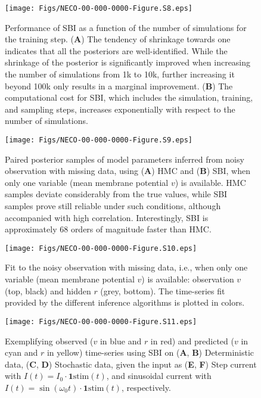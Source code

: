 \documentclass[12pt]{article}
\begin{document}
\begin{figure}[ht]
    \centering
    \texttt{[image: Figs/NECO-00-000-0000-Figure.S8.eps]}
    \renewcommand{\thefigure}{S\arabic{figure}}
    \caption{Performance of SBI as a function of the number of simulations for the training step. (\textbf{A}) The tendency of shrinkage towards one indicates that all the posteriors are well-identified. While the shrinkage of the posterior is significantly improved when increasing the number of simulations from 1k to 10k, further increasing it beyond 100k only results in a marginal improvement. (\textbf{B}) The computational cost for SBI, which includes the simulation, training, and sampling steps, increases exponentially with respect to the number of simulations. }
    \label{fig:SBI_ZandShrink}
\end{figure}


\begin{figure}
    \centering
    \texttt{[image: Figs/NECO-00-000-0000-Figure.S9.eps]}
    \renewcommand{\thefigure}{S\arabic{figure}}
    \caption{Paired posterior samples of model parameters inferred from noisy observation with missing data, using (\textbf{A}) HMC and (\textbf{B}) SBI, when only one variable (mean membrane potential $v$) is available. HMC samples deviate considerably from the true values, while SBI samples prove still reliable under such conditions, although accompanied with high correlation. Interestingly, SBI is approximately 68 orders of magnitude faster than HMC.}
    \label{fig:SDE_missingdata_joint_posterior}
\end{figure}


\begin{figure}[ht]
    \centering
    \texttt{[image: Figs/NECO-00-000-0000-Figure.S10.eps]}
    \renewcommand{\thefigure}{S\arabic{figure}}
    \caption{Fit to the noisy observation with missing data, i.e., when only one variable (mean membrane potential $v$) is available: observation $v$ (top, black) and hidden $r$ (grey, bottom). The time-series fit provided by the different inference algorithms is plotted in colors.}
    \label{fig:SDEmissingdata_timeseries}
\end{figure}


\begin{figure}
    \centering
    \texttt{[image: Figs/NECO-00-000-0000-Figure.S11.eps]}
    \renewcommand{\thefigure}{S\arabic{figure}}
    \caption{Exemplifying observed ($v$ in blue and $r$ in red) and predicted ($v$ in cyan and $r$ in yellow) time-series using SBI on (\textbf{A}, \textbf{B}) Deterministic data, (\textbf{C}, \textbf{D}) Stochastic data, given the input as (\textbf{E}, \textbf{F}) Step current with $I(t)=I_0 \cdot \mathbf{1}{\text{stim}}(t)$, and sinusoidal current with $I(t)=\sin (\omega_0 t) \cdot \mathbf{1}{\text{stim}}(t)$, respectively.}
    \label{fig:SBI_Timeseries_ISin_IStep}
\end{figure}
\end{document}
